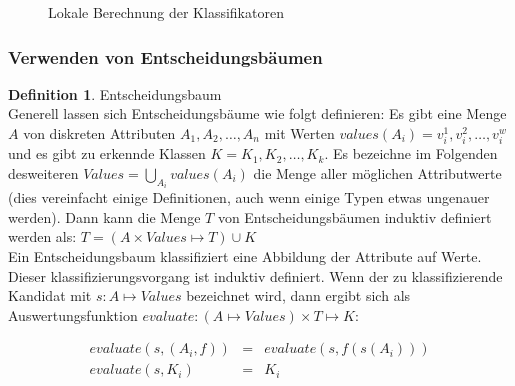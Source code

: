 \documentclass{article}
\theoremstyle{definition}
\newtheorem{definition}{Definition}
\theoremstyle{remark}
\begin{document}
\begin{figure}
\caption{Lokale Berechnung der Klassifikatoren}
\label{fig:local_computation_phase_diagram}
\end{figure}

\subsubsection{Verwenden von Entscheidungsb\"aumen}
\begin{definition} Entscheidungsbaum\\
Generell lassen sich Entscheidungsb\"aume wie folgt definieren: Es gibt eine
Menge \(A\) von diskreten Attributen \({A_1, A_2, \dots, A_n}\) mit Werten
\(values(A_i) = {v^1_i, v^2_i, \dots, v^w_i}\) und es gibt zu erkennde
Klassen \(K = {K_1, K_2, \dots, K_k}\). Es bezeichne im Folgenden desweiteren
\(Values = \bigcup_{A_i} values(A_i)\) die Menge aller m\"oglichen 
Attributwerte (dies vereinfacht einige Definitionen, auch wenn 
einige Typen etwas ungenauer werden).
Dann kann die Menge \(T\) von Entscheidungsb\"aumen induktiv definiert werden 
als:
\( T = (A \times Values \mapsto T) \cup K\)\\
Ein Entscheidungsbaum klassifiziert eine Abbildung der Attribute auf Werte.
Dieser klassifizierungsvorgang ist induktiv definiert. Wenn der
zu klassifizierende Kandidat mit \(s : A \mapsto Values\)
bezeichnet wird, dann ergibt sich als Auswertungsfunktion
\(evaluate : (A \mapsto Values) \times T \mapsto K\):

\begin{align}
evaluate(s, (A_i, f)) &=& evaluate(s, f(s(A_i)))\\
evaluate(s, K_i) &=& K_i
\end{align}
\end{definition}
\end{document}
